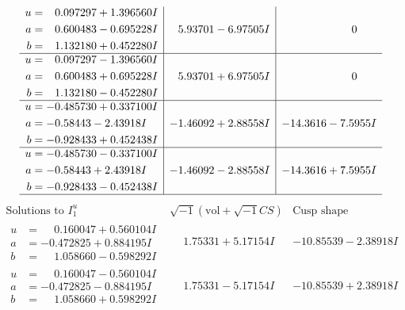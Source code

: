 \documentclass[1p]{elsarticle_modified}
\theoremstyle{definition}
\newcommand{\I}{\sqrt{-1}}
\begin{document}
$$\begin{array}{c|c|c}
\begin{aligned}
u &= \phantom{-}0.097297 + 1.396560 I \\
a &= \phantom{-}0.600483 - 0.695228 I \\
b &= \phantom{-}1.132180 + 0.452280 I\end{aligned}
 & \phantom{-}5.93701 - 6.97505 I & \phantom{-0.000000 } 0 \\ \hline\begin{aligned}
u &= \phantom{-}0.097297 - 1.396560 I \\
a &= \phantom{-}0.600483 + 0.695228 I \\
b &= \phantom{-}1.132180 - 0.452280 I\end{aligned}
 & \phantom{-}5.93701 + 6.97505 I & \phantom{-0.000000 } 0 \\ \hline\begin{aligned}
u &= -0.485730 + 0.337100 I \\
a &= -0.58443 - 2.43918 I \\
b &= -0.928433 + 0.452438 I\end{aligned}
 & -1.46092 + 2.88558 I & -14.3616 - 7.5955 I \\ \hline\begin{aligned}
u &= -0.485730 - 0.337100 I \\
a &= -0.58443 + 2.43918 I \\
b &= -0.928433 - 0.452438 I\end{aligned}
 & -1.46092 - 2.88558 I & -14.3616 + 7.5955 I\\
 \hline 
 \end{array}$$\newpage$$\begin{array}{c|c|c}  
\text{Solutions to }I^u_{1}& \I (\text{vol} + \sqrt{-1}CS) & \text{Cusp shape}\\
 \hline 
\begin{aligned}
u &= \phantom{-}0.160047 + 0.560104 I \\
a &= -0.472825 + 0.884195 I \\
b &= \phantom{-}1.058660 - 0.598292 I\end{aligned}
 & \phantom{-}1.75331 + 5.17154 I & -10.85539 - 2.38918 I \\ \hline\begin{aligned}
u &= \phantom{-}0.160047 - 0.560104 I \\
a &= -0.472825 - 0.884195 I \\
b &= \phantom{-}1.058660 + 0.598292 I\end{aligned}
 & \phantom{-}1.75331 - 5.17154 I & -10.85539 + 2.38918 I \\ \hline\begin{aligned}

\end{aligned}
\end{array}$$
\end{document}
